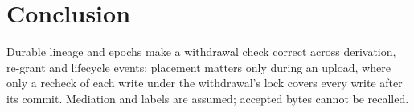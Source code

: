 \section{Conclusion}
Durable lineage and epochs make a withdrawal check correct across derivation, re-grant and lifecycle events; placement matters only during an upload, where only a recheck of each write under the withdrawal's lock covers every write after its commit. Mediation and labels are assumed; accepted bytes cannot be recalled.\label{body-end}

